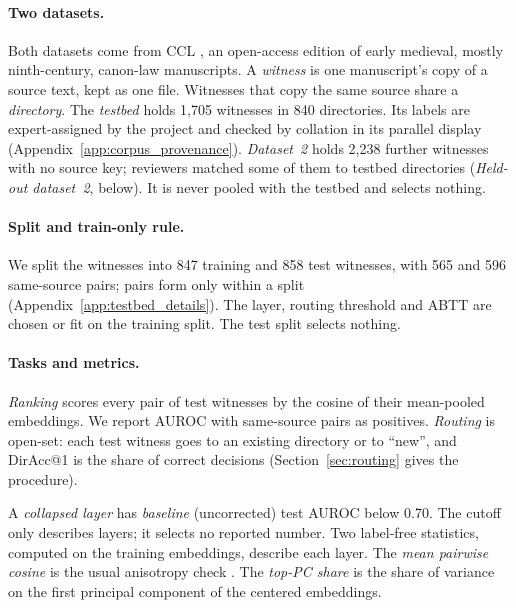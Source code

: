 \documentclass[11pt]{article}
\begin{document}
\paragraph{Two datasets.}
\label{sec:dataset}
Both datasets come from CCL \citep{firey2009ccl}, an open-access edition of early medieval, mostly ninth-century, canon-law manuscripts.
A \emph{witness} is one manuscript's copy of a source text, kept as one file.
Witnesses that copy the same source share a \emph{directory}.
The \emph{testbed} holds 1,705 witnesses in 840 directories.
Its labels are expert-assigned by the project and checked by collation in its parallel display (Appendix~\ref{app:corpus_provenance}).
\emph{Dataset~2} holds 2,238 further witnesses with no source key; reviewers matched some of them to testbed directories (\emph{Held-out dataset~2}, below).
It is never pooled with the testbed and selects nothing.

\paragraph{Split and train-only rule.}
\label{sec:setup}
\label{sec:layers}
We split the witnesses into 847 training and 858 test witnesses, with 565 and 596 same-source pairs; pairs form only within a split (Appendix~\ref{app:testbed_details}).
The layer, routing threshold and ABTT are chosen or fit on the training split.
The test split selects nothing.

\paragraph{Tasks and metrics.}
\label{sec:tasks}
\emph{Ranking} scores every pair of test witnesses by the cosine of their mean-pooled embeddings.
We report AUROC with same-source pairs as positives.
\emph{Routing} is open-set: each test witness goes to an existing directory or to ``new'', and DirAcc@1 is the share of correct decisions (Section~\ref{sec:routing} gives the procedure).

A \emph{collapsed layer} has \emph{baseline} (uncorrected) test AUROC below 0.70.
The cutoff only describes layers; it selects no reported number.
Two label-free statistics, computed on the training embeddings, describe each layer.
The \emph{mean pairwise cosine} is the usual anisotropy check \citep{ethayarajh2019contextual}.
The \emph{top-PC share} is the share of variance on the first principal component of the centered embeddings.


\end{document}
